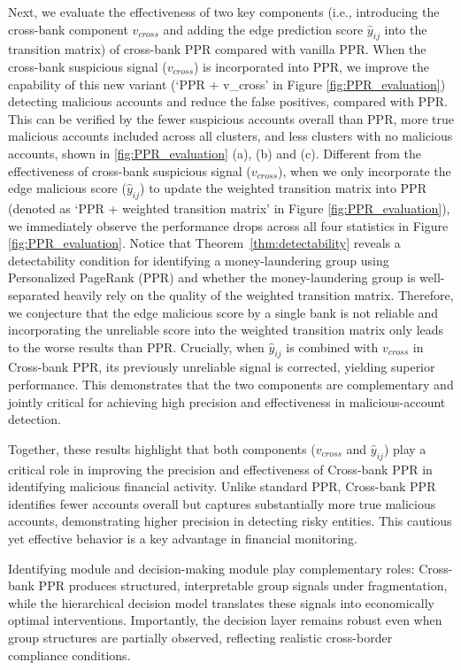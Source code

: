 \documentclass[11pt,english]{article}
\renewcommand{\hat}{\widehat}
\begin{document}
Next, we evaluate the effectiveness of two key components (i.e., introducing the cross-bank component $v_{cross}$ and adding the edge prediction score $\hat{y}_{ij}$ into the transition matrix) of cross-bank PPR compared with vanilla PPR. When the cross-bank suspicious signal ($v_{cross}$) is incorporated into PPR, we improve the capability of this new variant (`PPR + v\_cross' in Figure \ref{fig:PPR_evaluation}) detecting malicious accounts and reduce the false positives, compared with PPR. This can be verified by the fewer suspicious accounts overall than PPR, more true malicious accounts included across all clusters, and less clusters with no malicious accounts, shown in \ref{fig:PPR_evaluation} (a), (b) and (c). Different from the effectiveness of cross-bank suspicious signal ($v_{cross}$), when we only incorporate the edge malicious score ($\hat{y}_{ij}$) to update the weighted transition matrix into PPR (denoted as `PPR + weighted transition matrix' in Figure \ref{fig:PPR_evaluation}), we immediately observe the performance drops across all four statistics in Figure \ref{fig:PPR_evaluation}. 
Notice that Theorem~\ref{thm:detectability} reveals a detectability condition for identifying a money-laundering group using Personalized PageRank (PPR) and whether the money-laundering group is well-separated heavily rely on the quality of the weighted transition matrix. Therefore, we conjecture that the edge malicious score by a single bank is not reliable and incorporating the unreliable score into the weighted transition matrix only leads to the worse results than PPR. Crucially, when $\hat{y}_{ij}$ is combined with $v_{cross}$ in Cross-bank PPR, its previously unreliable signal is corrected, yielding superior performance. This demonstrates that the two components are complementary and jointly critical for achieving high precision and effectiveness in malicious-account detection.

Together, these results highlight that both components ($v_{cross}$ and $\hat{y}_{ij}$) play a critical role in improving the precision and effectiveness of Cross-bank PPR in identifying malicious financial activity. Unlike standard PPR, Cross-bank PPR identifies fewer accounts overall but captures substantially more true malicious accounts, demonstrating higher precision in detecting risky entities. This cautious yet effective behavior is a key advantage in financial monitoring.

Identifying module and decision-making module play complementary roles: Cross-bank PPR produces structured, interpretable group signals under fragmentation, while the hierarchical decision model translates these signals into economically optimal interventions. Importantly, the decision layer remains robust even when group structures are partially observed, reflecting realistic cross-border compliance conditions. 
\end{document}
